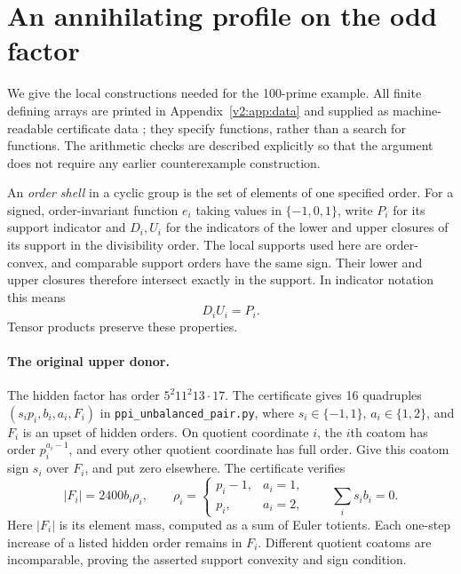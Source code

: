 \section{An annihilating profile on the odd factor}
\label{h100:interpolation}

We give the local constructions needed for the 100-prime example.  All
finite defining arrays are printed in Appendix~\ref{v2:app:data} and supplied
as machine-readable certificate data \cite{ConstructionH100};
they specify functions, rather than a search for functions.  The arithmetic
checks are described explicitly so that the argument does not require any
earlier counterexample construction.

An \emph{order shell} in a cyclic group is the set of elements of one
specified order.  For a signed, order-invariant function $e_i$ taking
values in $\{-1,0,1\}$, write $P_i$ for its support indicator and $D_i,U_i$
for the indicators of the lower and upper closures of its support in the
divisibility order.  The local supports used here are order-convex, and
comparable support orders have the same sign.  Their lower and upper
closures therefore intersect exactly in the support.  In indicator
notation this means
\begin{equation}\label{h100:local-convexity}
 D_iU_i=P_i.
\end{equation}
Tensor products preserve these properties.

\paragraph{The original upper donor.}
The hidden factor has order $5^2 11^2 13\cdot17$.  The certificate gives
16 quadruples $(s_i p_i,b_i,a_i,F_i)$ in \texttt{ppi\_unbalanced\_pair.py}, where $s_i\in\{-1,1\}$,
$a_i\in\{1,2\}$, and $F_i$ is an upset of hidden orders.  On quotient
coordinate $i$, the $i$th coatom has order $p_i^{a_i-1}$, and every other
quotient coordinate has full order.  Give this coatom sign $s_i$ over
$F_i$, and put zero elsewhere.  The certificate verifies
\begin{equation}\label{h100:upper-fibres}
 |F_i|=2400 b_i\rho_i,\qquad
 \rho_i=\begin{cases}p_i-1,&a_i=1,\\p_i,&a_i=2,\end{cases}
 \qquad \sum_i s_i b_i=0.
\end{equation}
Here $|F_i|$ is its element mass, computed as a sum of Euler totients.
Each one-step increase of a listed hidden order remains in $F_i$.
Different quotient coatoms are incomparable, proving the asserted
support convexity and sign condition.

